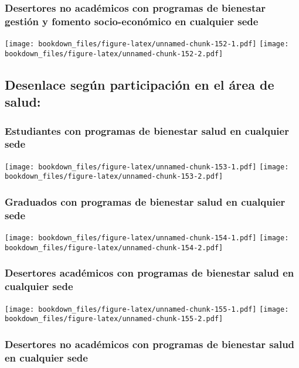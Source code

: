 \documentclass[]{article}
\theoremstyle{definition}
\theoremstyle{definition}
\theoremstyle{definition}
\theoremstyle{remark}
\begin{document}
\subsubsection{Desertores no académicos con programas de bienestar
gestión y fomento socio-económico en cualquier
sede}\label{desertores-no-academicos-con-programas-de-bienestar-gestion-y-fomento-socio-economico-en-cualquier-sede}

\texttt{[image: bookdown\_files/figure-latex/unnamed-chunk-152-1.pdf]}
\texttt{[image: bookdown\_files/figure-latex/unnamed-chunk-152-2.pdf]}

\subsection{Desenlace según participación en el área de
salud:}\label{desenlace-segun-participacion-en-el-area-de-salud}

\subsubsection{Estudiantes con programas de bienestar salud en cualquier
sede}\label{estudiantes-con-programas-de-bienestar-salud-en-cualquier-sede}

\texttt{[image: bookdown\_files/figure-latex/unnamed-chunk-153-1.pdf]}
\texttt{[image: bookdown\_files/figure-latex/unnamed-chunk-153-2.pdf]}

\subsubsection{Graduados con programas de bienestar salud en cualquier
sede}\label{graduados-con-programas-de-bienestar-salud-en-cualquier-sede}

\texttt{[image: bookdown\_files/figure-latex/unnamed-chunk-154-1.pdf]}
\texttt{[image: bookdown\_files/figure-latex/unnamed-chunk-154-2.pdf]}

\subsubsection{Desertores académicos con programas de bienestar salud en
cualquier
sede}\label{desertores-academicos-con-programas-de-bienestar-salud-en-cualquier-sede}

\texttt{[image: bookdown\_files/figure-latex/unnamed-chunk-155-1.pdf]}
\texttt{[image: bookdown\_files/figure-latex/unnamed-chunk-155-2.pdf]}

\subsubsection{Desertores no académicos con programas de bienestar salud
en cualquier
sede}\label{desertores-no-academicos-con-programas-de-bienestar-salud-en-cualquier-sede}
\end{document}
